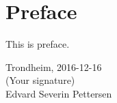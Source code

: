 \section*{Preface}
This is preface.\\[2cm]

\begin{center}
Trondheim, 2016-12-16\\[1pc]
(Your signature)\\[1pc]
Edvard Severin Pettersen
\end{center}